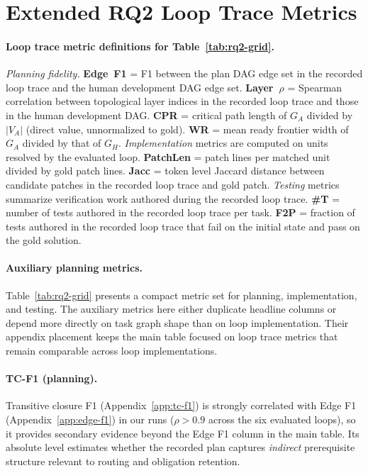 \section{Extended RQ2 Loop Trace Metrics}\label{app:rq2-extended}

\paragraph{Loop trace metric definitions for Table~\ref{tab:rq2-grid}.}
\emph{Planning fidelity.}
\textbf{Edge~F1} = F1 between the plan DAG edge set in the recorded loop trace and the human development DAG edge set.
\textbf{Layer~$\rho$} = Spearman correlation between topological layer indices in the recorded loop trace and those in the human development DAG. \textbf{CPR} = critical path length of $G_A$ divided by $|V_A|$ (direct value, unnormalized to gold). \textbf{WR} = mean ready frontier width of $G_A$ divided by that of $G_H$.
\emph{Implementation} metrics are computed on units resolved by the evaluated loop. \textbf{PatchLen} = patch lines per matched unit divided by gold patch lines. \textbf{Jacc} = token level Jaccard distance between candidate patches in the recorded loop trace and gold patch.
\emph{Testing} metrics summarize verification work authored during the recorded loop trace.
\textbf{\#T} = number of tests authored in the recorded loop trace per task.
\textbf{F2P} = fraction of tests authored in the recorded loop trace that fail on the initial state and pass on the gold solution.
\paragraph{Auxiliary planning metrics.}
Table~\ref{tab:rq2-grid} presents a compact metric set for planning, implementation, and testing. The auxiliary metrics here either duplicate headline columns or depend more directly on task graph shape than on loop implementation. Their appendix placement keeps the main table focused on loop trace metrics that remain comparable across loop implementations.

\paragraph{TC-F1 (planning).}
Transitive closure F1 (Appendix~\ref{app:tc-f1}) is strongly correlated with Edge F1 (Appendix~\ref{app:edge-f1}) in our runs ($\rho{>}0.9$ across the six evaluated loops), so it provides secondary evidence beyond the Edge F1 column in the main table. Its absolute level estimates whether the recorded plan captures \emph{indirect} prerequisite structure relevant to routing and obligation retention.

